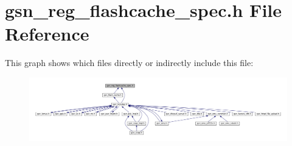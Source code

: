 \hypertarget{a00550}{
\section{gsn\_\-reg\_\-flashcache\_\-spec.h File Reference}
\label{a00550}
}
This graph shows which files directly or indirectly include this file:
\nopagebreak
\begin{figure}[H]
\begin{center}
\leavevmode
\includegraphics[width=400pt]{a00786}
\end{center}
\end{figure}
